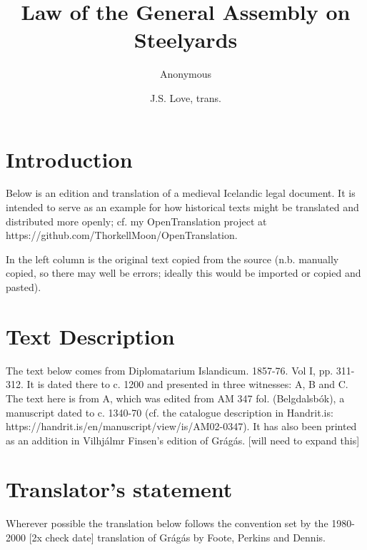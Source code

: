 \documentclass[12pt]{article}
\title{Law of the General Assembly on Steelyards}
\author{
Anonymous\\
\and
J.S. Love, trans.}
\begin{document}
\maketitle


\section*{Introduction}

Below is an edition and translation of a medieval Icelandic legal document. It
is intended to serve as an example for how historical texts might be translated
and distributed more openly; cf. my OpenTranslation project at https://github.com/ThorkellMoon/OpenTranslation.
\par
In the left column is the original text copied from the source (n.b. manually
copied, so there may well be errors; ideally this would be imported or copied
and pasted).

\section*{Text Description}
The text below comes from Diplomatarium Islandicum. 1857-76. Vol I, pp. 311-312.
It is dated there to c. 1200 and presented in three witnesses: A, B and C. The
text here is from A, which was edited from AM 347 fol. (Belgdalsbók), a manuscript
dated to c. 1340-70 (cf. the catalogue description in Handrit.is: https://handrit.is/en/manuscript/view/is/AM02-0347).
It has also been printed as an addition in Vilhjálmr Finsen's edition of
Grágás. [will need to expand this]
\section*{Translator's statement}
Wherever possible the translation below follows the convention set by the 1980-2000
[2x check date] translation of Grágás by Foote, Perkins and Dennis.
\end{document}
